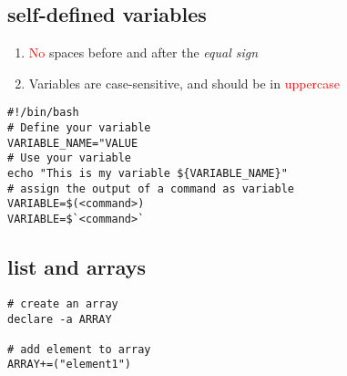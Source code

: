 \documentclass[12pt,a4paper]{article}
\newcommand{\rt}[1]{\textcolor{red}{#1}}
\begin{document}
\subsection{self-defined variables}
\begin{enumerate}
	\item \rt{No} spaces before and after the \textit{equal sign}
	\item Variables are case-sensitive, and should be in \rt{uppercase}
\end{enumerate}
\begin{footnotesize}
\begin{verbatim}
#!/bin/bash
# Define your variable
VARIABLE_NAME="VALUE
# Use your variable
echo "This is my variable ${VARIABLE_NAME}"
# assign the output of a command as variable
VARIABLE=$(<command>)
VARIABLE=$`<command>`
\end{verbatim}
\end{footnotesize}

\subsection{list and arrays}
\begin{footnotesize}
\begin{verbatim}
# create an array
declare -a ARRAY

# add element to array
ARRAY+=("element1")
\end{verbatim}
\end{footnotesize}
\end{document}
